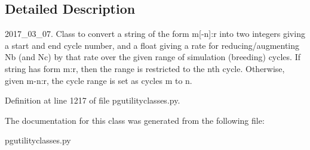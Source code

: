 \subsection{Detailed Description}
\begin{DoxyVerb}2017_03_07.  Class to convert a string of the form m[-n]:r
into two integers giving a start and end cycle number,
and a float giving a rate for reducing/augmenting
Nb (and Nc) by that rate over the given range of simulation 
(breeding) cycles.  If string has form m:r, then the range 
is restricted to the nth cycle.  Otherwise, given m-n:r, 
the cycle range is set as cycles m to n.\end{DoxyVerb}
 

Definition at line 1217 of file pgutilityclasses.\+py.



The documentation for this class was generated from the following file\+:\begin{DoxyCompactItemize}
\item 
pgutilityclasses.\+py\end{DoxyCompactItemize}
